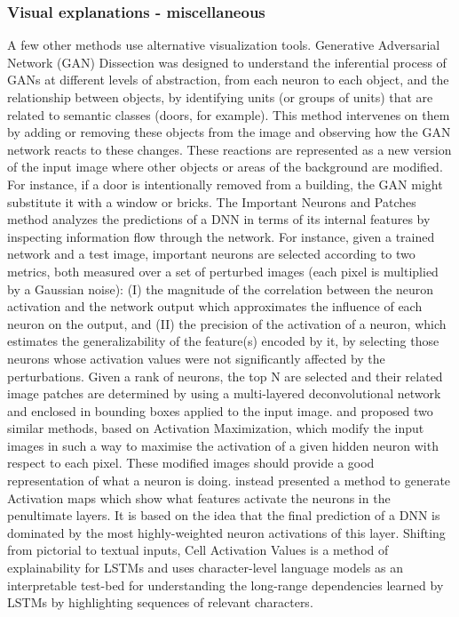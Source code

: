 \documentclass[final,1p,times]{elsarticle}
\begin{document}
\subsubsection{Visual explanations - miscellaneous}
A few other methods use alternative visualization tools. Generative Adversarial Network (GAN) Dissection \cite{bau2019gandissect} was designed to understand the inferential process of GANs at different levels of abstraction, from each neuron to each object, and the relationship between objects, by identifying units (or groups of units) that are related to semantic classes (doors, for example). This method intervenes on them by adding or removing these objects from the image and observing how the GAN network reacts to these changes. These reactions are represented as a new version of the input image where other objects or areas of the background are modified. For instance, if a door is intentionally removed from a building, the GAN might substitute it with a window or bricks.
The Important Neurons and Patches method \cite{lengerich2017towards} analyzes the predictions of a DNN in terms of its internal features by inspecting information flow through the network. For instance, given a trained network and a test image, important neurons are selected according to two metrics, both measured over a set of perturbed images (each pixel is multiplied by a Gaussian noise): (I) the magnitude of the correlation between the neuron activation and the network output which approximates the influence of each neuron on the output, and (II) the precision of the activation of a neuron, which estimates the generalizability of the feature(s) encoded by it, by selecting those neurons whose activation values were not significantly affected by the perturbations. Given a rank of neurons, the top N are selected and their related image patches are determined by using a multi-layered deconvolutional network and enclosed in bounding boxes applied to the input image.
\cite{erhan2010understanding} and \cite{nguyen2016multifaceted,nguyen2016synthesizing} proposed two similar methods, based on Activation Maximization, which modify the input images in such a way to maximise the activation of a given hidden neuron with respect to each pixel. These modified images should provide a good representation of what a neuron is doing. \cite{hamidi2019interactive} instead presented a method to generate Activation maps which show what features activate the neurons in the penultimate layers. It is based on the idea that the final prediction of a DNN is dominated by the most highly-weighted neuron activations of this layer. 
Shifting from pictorial to textual inputs, Cell Activation Values \cite{karpathy2015visualizing} is a method of explainability for LSTMs and uses character-level language models as an interpretable test-bed for understanding the long-range dependencies learned by LSTMs by highlighting sequences of relevant characters.\\ \newpage
\end{document}
